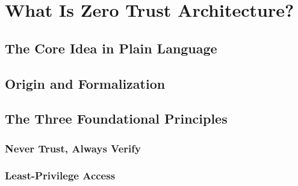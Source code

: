 \documentclass[12pt, letterpaper]{article}
\begin{document}
\section{What Is Zero Trust Architecture?}

\subsection{The Core Idea in Plain Language}
%

\subsection{Origin and Formalization}

\subsection{The Three Foundational Principles}

    \subsubsection{Never Trust, Always Verify}

    \subsubsection{Least-Privilege Access}
\end{document}
